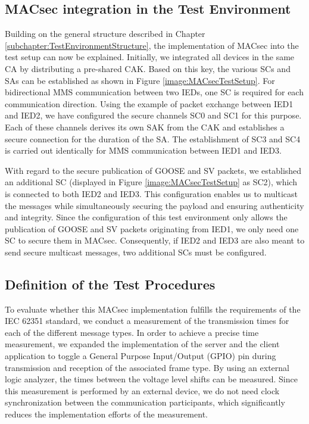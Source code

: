 \documentclass[conference, onecolumn, a4paper]{IEEEtran}
\begin{document}
\subsection{MACsec integration in the Test Environment}
\label{subchapter:TestEnvironmentMACsec}
\noindent Building on the general structure described in Chapter \ref{subchapter:TestEnvironmentStructure}, the implementation of MACsec into the test 
setup can now be explained. Initially, we integrated all devices in the same CA by distributing a pre-shared CAK. Based on this key, the various SCs and 
SAs can be established as shown in Figure \ref{image:MACsecTestSetup}. For bidirectional MMS communication between two IEDs, one SC is required for each 
communication direction. Using the example of packet exchange between IED1 and IED2, we have configured the secure channels SC0 and SC1 for this purpose. 
Each of these channels derives its own SAK from the CAK and establishes a secure connection for the duration of the SA. The establishment of SC3 and SC4 
is carried out identically for MMS communication between IED1 and IED3.

\smallskip
With regard to the secure publication of GOOSE and SV packets, we established an additional SC (displayed in Figure \ref{image:MACsecTestSetup} as SC2), 
which is connected to both IED2 and IED3. This configuration enables us to multicast the messages while simultaneously securing the payload and ensuring 
authenticity and integrity. Since the configuration of this test environment only allows the publication of GOOSE and SV packets originating from IED1, 
we only need one SC to secure them in MACsec. Consequently, if IED2 and IED3 are also meant to send secure multicast messages, two additional SCs must be 
configured.   

\subsection{Definition of the Test Procedures}
\label{subchapter:TestProcedures}
\noindent To evaluate whether this MACsec implementation fulfills the requirements of the IEC 62351 standard, we conduct a measurement of the 
transmission times for each of the different message types. In order to achieve a precise time measurement, we expanded the implementation of the server 
and the client application to toggle a General Purpose Input/Output (GPIO) pin during transmission and reception of the associated frame type. 
By using an external logic analyzer, the times between the voltage level shifts can be measured. Since this measurement is performed by an external device, 
we do not need clock synchronization between the communication participants, which significantly reduces the implementation efforts of the measurement. 
\end{document}

